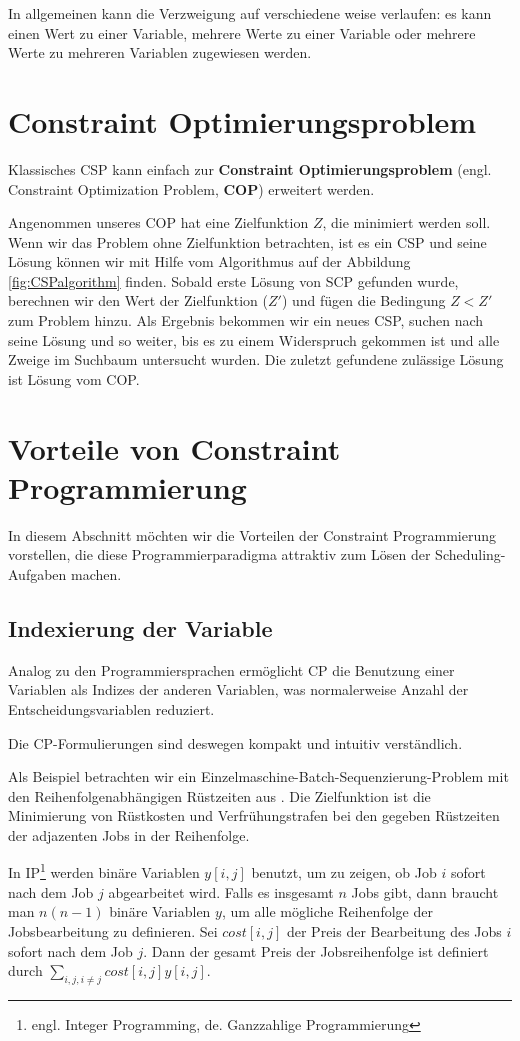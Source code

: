 In allgemeinen kann die Verzweigung auf verschiedene weise verlaufen: es kann einen Wert zu einer Variable, mehrere Werte zu einer Variable oder mehrere Werte zu mehreren Variablen zugewiesen werden.

\section{Constraint Optimierungsproblem}
Klassisches CSP kann einfach zur {\bf Constraint Optimierungsproblem} (engl. Constraint Optimization Problem, {\bf COP}) erweitert werden. 

Angenommen unseres COP hat eine Zielfunktion $Z$, die minimiert werden soll. Wenn wir das Problem ohne Zielfunktion betrachten, ist es ein CSP und seine Lösung können wir mit Hilfe vom Algorithmus auf der Abbildung \ref{fig:CSPalgorithm} finden. Sobald erste Lösung von SCP gefunden wurde, berechnen wir den Wert der Zielfunktion ($Z'$) und fügen die Bedingung $Z<Z'$ zum Problem hinzu. Als Ergebnis bekommen wir ein neues CSP, suchen nach seine Lösung und so weiter, bis es zu einem Widerspruch gekommen ist und alle Zweige im Suchbaum untersucht wurden. Die zuletzt gefundene zulässige Lösung  ist Lösung vom COP.

\section{Vorteile von Constraint Programmierung}

In diesem Abschnitt möchten wir die Vorteilen der Constraint Programmierung vorstellen, die diese Programmierparadigma attraktiv zum Lösen der Scheduling-Aufgaben  machen.

\subsection {Indexierung der Variable}
Analog zu den Programmiersprachen ermöglicht CP die Benutzung einer Variablen als Indizes der anderen Variablen, was normalerweise Anzahl der  Entscheidungsvariablen reduziert.

Die CP-Formulierungen sind deswegen kompakt und intuitiv verständlich.

Als Beispiel betrachten wir ein Einzelmaschine-Batch-Sequenzierung-Problem mit den Reihenfolgenabhängigen Rüstzeiten aus \cite{Jordan}. Die Zielfunktion ist die Minimierung von Rüstkosten und Verfrühungstrafen bei den gegeben Rüstzeiten der adjazenten Jobs in der Reihenfolge.

In IP\footnote{engl. Integer Programming, de. Ganzzahlige Programmierung} werden binäre Variablen $y[i,j]$ benutzt, um zu zeigen, ob Job $i$ sofort nach dem Job $j$ abgearbeitet wird. Falls es insgesamt $n$ Jobs gibt, dann braucht man $n(n-1)$ binäre Variablen $y$, um alle mögliche Reihenfolge der Jobsbearbeitung zu definieren. Sei $cost[i,j]$ der Preis der Bearbeitung des Jobs $i$ sofort nach dem Job $j$. Dann der gesamt Preis der Jobsreihenfolge ist definiert durch $\sum_{i,j,i\not =  j} {cost[i,j]y[i,j]}$.

